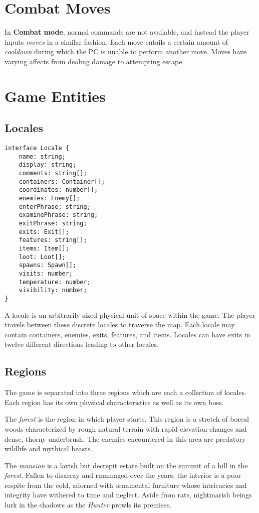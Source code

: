 \documentclass[11pt]{article}
\begin{document}
	\section{Combat Moves}
	In \textbf{Combat mode}, normal commands are not available, and instead the player inputs \textit{moves} in a similar fashion. Each move entails a certain amount of \textit{cooldown} during which the PC is unable to perform another move. Moves have varying affects from dealing damage to attempting escape.
	
	\section{Game Entities}
	\subsection{Locales}

	\begin{lstlisting}
interface Locale {
	name: string;
	display: string;
	comments: string[];
	containers: Container[];
	coordinates: number[];
	enemies: Enemy[];
	enterPhrase: string;
	examinePhrase: string;
	exitPhrase: string;
	exits: Exit[];
	features: string[];
	items: Item[];
	loot: Loot[];
	spawns: Spawn[];
	visits: number;
	temperature: number;
	visibility: number;
}
	\end{lstlisting}
	
	A locale is an arbitrarily-sized physical unit of space within the game. The player travels between these discrete locales to traverse the map. Each locale may contain containers, enemies, exits, features, and items. Locales can have exits in twelve different directions leading to other locales.
	
	\subsection{Regions}
	
	The game is separated into three regions which are each a collection of locales. Each region has its own physical characteristics as well as its own boss.
	
	The \textit{forest} is the region in which player starts. This region is a stretch of boreal woods characterized by rough natural terrain with rapid elevation changes and dense, thorny underbrush. The enemies encountered in this area are predatory wildlife and mythical beasts.
	
	The \textit{mansion} is a lavish but decrepit estate built on the summit of a hill in the \textit{forest}. Fallen to disarray and rummaged over the years, the interior is a poor respite from the cold, adorned with ornamental furniture whose intricacies and integrity have withered to time and neglect. Aside from rats, nightmarish beings lurk in the shadows as the \textit{Hunter} prowls its premises.
	
\end{document}

